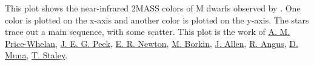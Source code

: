 This plot shows the near-infrared 2MASS colors of M dwarfs observed by \cite{2014AJ....147...20N}. One color is plotted on the x-axis and another color is plotted on the y-axis. The stars trace out a main sequence, with some scatter. This plot is the work of \href{http://adrian.pw}{A. M. Price-Whelan}, \href{http://www.astro.columbia.edu/~jpeek/}{J. E. G. Peek}, \href{https://www.cfa.harvard.edu/~enewton/}{E. R. Newton}, \href{http://people.seas.harvard.edu/~borkin/}{M. Borkin}, \href{http://www.physics.usyd.edu.au/~jallen/}{J. Allen}, \href{http://www.ruthangus.co.uk/}{R. Angus}, \href{}{D. Muna}, \href{http://www.ast.cam.ac.uk/~ts337/}{T. Staley}. 